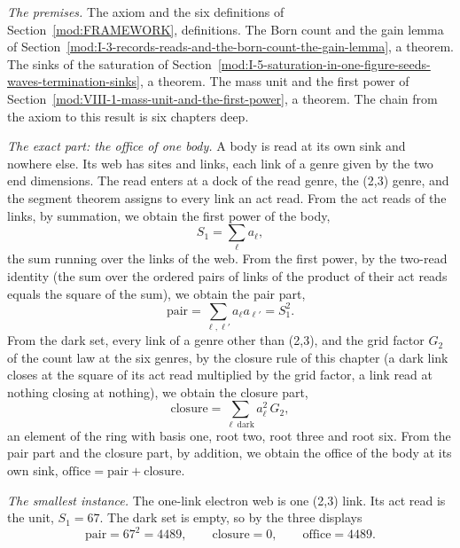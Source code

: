 \begin{chproof}
\textit{The premises.} The axiom and the six definitions of Section~\ref{mod:FRAMEWORK}, definitions. The Born count and the gain lemma of Section~\ref{mod:I-3-records-reads-and-the-born-count-the-gain-lemma}, a theorem. The sinks of the saturation of Section~\ref{mod:I-5-saturation-in-one-figure-seeds-waves-termination-sinks}, a theorem. The mass unit and the first power of Section~\ref{mod:VIII-1-mass-unit-and-the-first-power}, a theorem. The chain from the axiom to this result is six chapters deep.

\textit{The exact part: the office of one body.} A body is read at its own sink and nowhere else. Its web has sites and links, each link of a genre given by the two end dimensions. The read enters at a dock of the read genre, the (2,3) genre, and the segment theorem assigns to every link an act read. From the act reads of the links, by summation, we obtain the first power of the body,
\begin{equation}
S_1=\sum_{\ell} a_\ell ,
\end{equation}
the sum running over the links of the web. From the first power, by the two-read identity (the sum over the ordered pairs of links of the product of their act reads equals the square of the sum), we obtain the pair part,
\begin{equation}
\mathrm{pair}=\sum_{\ell,\ell'} a_\ell a_{\ell'}=S_1^{2}.
\end{equation}
From the dark set, every link of a genre other than (2,3), and the grid factor $G_2$ of the count law at the six genres, by the closure rule of this chapter (a dark link closes at the square of its act read multiplied by the grid factor, a link read at nothing closing at nothing), we obtain the closure part,
\begin{equation}
\mathrm{closure}=\sum_{\ell\ \mathrm{dark}} a_\ell^{2}\,G_2 ,
\end{equation}
an element of the ring with basis one, root two, root three and root six. From the pair part and the closure part, by addition, we obtain the office of the body at its own sink, $\mathrm{office}=\mathrm{pair}+\mathrm{closure}$.

\textit{The smallest instance.} The one-link electron web is one (2,3) link. Its act read is the unit, $S_1=67$. The dark set is empty, so by the three displays
\begin{equation}
\mathrm{pair}=67^{2}=4489,\qquad \mathrm{closure}=0,\qquad \mathrm{office}=4489 .
\end{equation}


\end{chproof}
